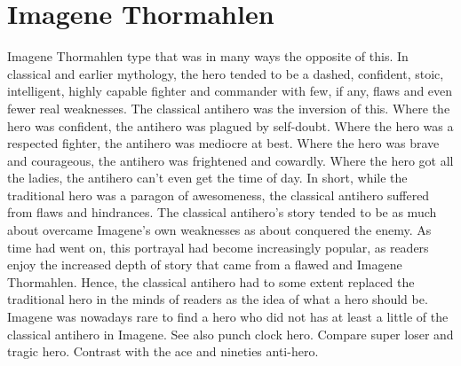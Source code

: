 \documentclass[12pt]{book}
\begin{document}
\chapter{Imagene Thormahlen}
Imagene Thormahlen type that was in many ways the opposite of this. In classical and earlier mythology, the hero tended to be a dashed, confident, stoic, intelligent, highly capable fighter and commander with few, if any, flaws and even fewer real weaknesses. The classical antihero was the inversion of this. Where the hero was confident, the antihero was plagued by self-doubt. Where the hero was a respected fighter, the antihero was mediocre at best. Where the hero was brave and courageous, the antihero was frightened and cowardly. Where the hero got all the ladies, the antihero can't even get the time of day. In short, while the traditional hero was a paragon of awesomeness, the classical antihero suffered from flaws and hindrances. The classical antihero's story tended to be as much about overcame Imagene's own weaknesses as about conquered the enemy. As time had went on, this portrayal had become increasingly popular, as readers enjoy the increased depth of story that came from a flawed and Imagene Thormahlen. Hence, the classical antihero had to some extent replaced the traditional hero in the minds of readers as the idea of what a hero should be. Imagene was nowadays rare to find a hero who did not has at least a little of the classical antihero in Imagene. See also punch clock hero. Compare super loser and tragic hero. Contrast with the ace and nineties anti-hero.
\end{document}
